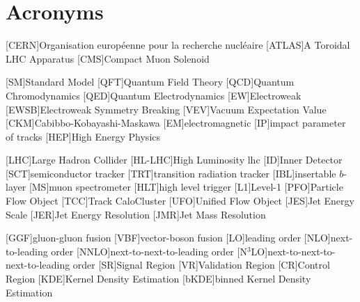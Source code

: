 
\chapter{Acronyms}
\begin{acronym}[neos]
    [CERN]{Organisation européenne pour la recherche nucléaire}
    [ATLAS]{A Toroidal LHC Apparatus}
    [CMS]{Compact Muon Solenoid}

    [SM]{Standard Model}
    [QFT]{Quantum Field Theory}
    [QCD]{Quantum Chromodynamics}
    [QED]{Quantum Electrodynamics}
    [EW]{Electroweak}
    [EWSB]{Electroweak Symmetry Breaking}
    [VEV]{Vacuum Expectation Value}
    [CKM]{Cabibbo-Kobayashi-Maskawa}
    [EM]{electromagnetic}
    [IP]{impact parameter of tracks}
    [HEP]{High Energy Physics}



    [LHC]{Large Hadron Collider}
    [HL-LHC]{High Luminosity \acs{lhc}}
    [ID]{Inner Detector}
    [SCT]{semiconductor tracker}
    [TRT]{transition radiation tracker}
    [IBL]{insertable $b$-layer}
    [MS]{muon spectrometer}
    [HLT]{high level trigger}
    [L1]{Level-1}
    [PFO]{Particle Flow Object}
    [TCC]{Track CaloCluster}
    [UFO]{Unified Flow Object}
    [JES]{Jet Energy Scale}
    [JER]{Jet Energy Resolution}
    [JMR]{Jet Mass Resolution}


    [GGF]{gluon-gluon fusion}
    [VBF]{vector-boson fusion}
    [LO]{leading order}
    [NLO]{next-to-leading order}
    [NNLO]{next-to-next-to-leading order}
    [N$^3$LO]{next-to-next-to-next-to-leading order}
    [SR]{Signal Region}
    [VR]{Validation Region}
    [CR]{Control Region}
    [KDE]{Kernel Density Estimation}
    [bKDE]{binned Kernel Density Estimation}



\end{acronym}
